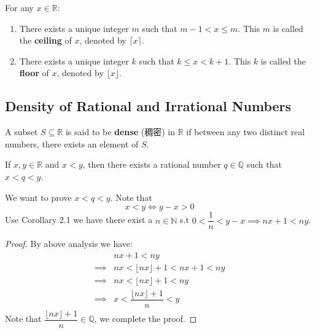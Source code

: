 \documentclass[
	UTF-8,
	11pt, %
	a4paper, %
]{LegrandOrangeBook}
\begin{document}
    \begin{lemma}
    For any $x \in \mathbb{R}$:
    \begin{enumerate}
        \item There exists a unique integer $m$ such that $m-1 < x \le m$. This $m$ is called the \textbf{ceiling} of $x$, denoted by $\lceil x \rceil$.
        \item There exists a unique integer $k$ such that $k \le x < k+1$. This $k$ is called the \textbf{floor} of $x$, denoted by $\lfloor x \rfloor$.
    \end{enumerate}
    \end{lemma}

    \newpage
    

    \subsection{Density of Rational and Irrational Numbers}

    A subset $S \subseteq \mathbb{R}$ is said to be \textbf{dense} (稠密) in $\mathbb{R}$ if between any two distinct real numbers, there exists an element of $S$.

    \begin{theorem}
    If $x, y \in \mathbb{R}$ and $x < y$, then there exists a rational number $q \in \mathbb{Q}$ such that $x < q < y$.
    \end{theorem}

    \begin{analysis}
    We want to prove $x<q<y$. Note that 
    $$
    x<y \iff y-x>0
    $$
    Use Corollary 2.1 we have there exist a $n \in \mathbb{N}$ s.t $0<\dfrac{1}{n}<y-x \implies nx + 1 < ny$.
    \end{analysis}

    \begin{proof}
    By above analysis we have:
    \begin{align*}
                 &nx + 1 < ny \\
        \implies & nx <\lfloor nx \rfloor +1 <nx+1 <ny \\
        \implies & nx <\lfloor nx \rfloor +1 <ny \\
        \implies & x <\dfrac{\lfloor nx \rfloor +1}{n} <y 
    \end{align*}
    Note that $\dfrac{\lfloor nx \rfloor +1}{n} \in \mathbb{Q}$, we complete the proof.
    \end{proof}
\end{document}
